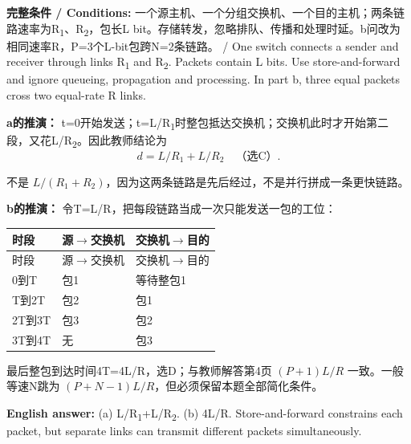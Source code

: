

\textbf{完整条件 / Conditions:} 一个源主机、一个分组交换机、一个目的主机；两条链路速率为R\textsubscript{1}、R\textsubscript{2}，包长L bit。存储转发，忽略排队、传播和处理时延。b问改为相同速率R，P=3个L-bit包跨N=2条链路。 / One switch connects a sender and receiver through links R\textsubscript{1} and R\textsubscript{2}. Packets contain L bits. Use store-and-forward and ignore queueing, propagation and processing. In part b, three equal packets cross two equal-rate R links.




\textbf{a的推演：} t=0开始发送；t=L/R\textsubscript{1}时整包抵达交换机；交换机此时才开始第二段，又花L/R\textsubscript{2}。因此教师结论为
\[
d=L/R_1+L/R_2\quad\text{（选C）}.\tag{T1.1}
\]


不是 \(L/(R_1+R_2)\)，因为这两条链路是先后经过，不是并行拼成一条更快链路。


\textbf{b的推演：} 令T=L/R，把每段链路当成一次只能发送一包的工位：


\begingroup
\small\setlength{\tabcolsep}{3pt}
\renewcommand{\arraystretch}{1.22}
\begin{longtable}{@{}>{\raggedright\arraybackslash}p{}>{\raggedright\arraybackslash}p{}>{\raggedright\arraybackslash}p{}@{}}
\toprule
时段 & 源\ensuremath{\to}交换机 & 交换机\ensuremath{\to}目的 \\
\midrule\endfirsthead
时段 & 源\ensuremath{\to}交换机 & 交换机\ensuremath{\to}目的 \\
\midrule\endhead
\bottomrule\endfoot
0到T & 包1 & 等待整包1 \\
T到2T & 包2 & 包1 \\
2T到3T & 包3 & 包2 \\
3T到4T & 无 & 包3 \\
\end{longtable}
\endgroup


最后整包到达时间4T=4L/R，选D；与教师解答第4页 \((P+1)L/R\) 一致。一般等速N跳为 \((P+N-1)L/R\)，但必须保留本题全部简化条件。


\textbf{English answer:} (a) L/R\textsubscript{1}+L/R\textsubscript{2}. (b) 4L/R. Store-and-forward constrains each packet, but separate links can transmit different packets simultaneously.


